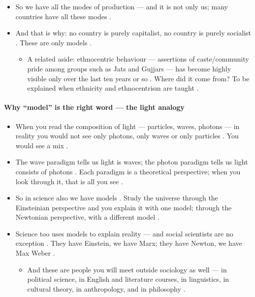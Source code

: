 \begin{itemize}
    \item So we have all the modes of production --- and it is not only us; many countries have all these modes .
    \item And that is why: no country is purely capitalist, no country is purely socialist . These are only models .
    \begin{itemize}
        \item A related aside: ethnocentric behaviour --- assertions of caste/community pride among groups such as Jats and Gujjars --- has become highly visible only over the last ten years or so . Where did it come from? To be explained when ethnicity and ethnocentrism are taught .
    \end{itemize}
\end{itemize}

\paragraph{Why ``model'' is the right word --- the light analogy}
\begin{itemize}
    \item When you read the composition of light --- particles, waves, photons --- in reality you would not see only photons, only waves or only particles . You would see a mix .
    \item The wave paradigm tells us light is waves; the photon paradigm tells us light consists of photons . Each paradigm is a theoretical perspective; when you look through it, that is all you see .
    \item So in science also we have models . Study the universe through the Einsteinian perspective and you explain it with one model; through the Newtonian perspective, with a different model .
    \item Science too uses models to explain reality --- and social scientists are no exception . They have Einstein, we have Marx; they have Newton, we have Max Weber .
    \begin{itemize}
        \item And these are people you will meet outside sociology as well --- in political science, in English and literature courses, in linguistics, in cultural theory, in anthropology, and in philosophy .
    \end{itemize}
\end{itemize}

